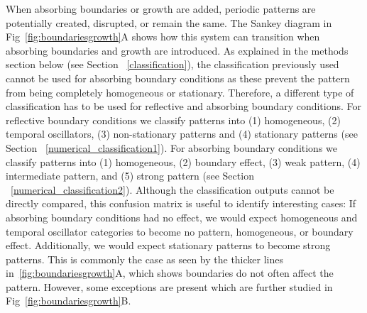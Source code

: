When absorbing boundaries or growth are added, periodic patterns are potentially created, disrupted, or remain the same. The Sankey diagram in Fig~\ref{fig:boundariesgrowth}A shows how this system can transition when absorbing boundaries and growth are introduced.
As explained in the methods section below (see Section ~\ref{classification}), the classification previously used cannot be used for absorbing boundary conditions as these prevent the pattern from being completely homogeneous or stationary.  %
Therefore, a different type of classification has to be used for reflective and absorbing boundary conditions. For reflective boundary conditions we classify patterns into (1) homogeneous, (2) temporal oscillators, (3) non-stationary patterns and (4) stationary patterns (see Section ~\ref{numerical_classification1}). For absorbing boundary conditions we classify patterns into (1) homogeneous, (2) boundary effect, (3) weak pattern, (4) intermediate pattern, and (5) strong pattern (see Section ~\ref{numerical_classification2}).
Although the classification outputs cannot be directly compared, this confusion matrix is useful to identify interesting cases:
If absorbing boundary conditions had no effect, we would expect homogeneous and temporal oscillator categories to become no pattern, homogeneous, or boundary effect.
Additionally, we would expect stationary patterns to become strong patterns.
This is commonly the case as seen by the thicker lines in~\ref{fig:boundariesgrowth}A, which shows boundaries do not often affect the pattern.
However, some exceptions are present which are further studied in Fig~\ref{fig:boundariesgrowth}B.

